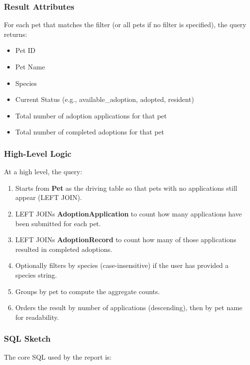 \documentclass[11pt]{article}
\begin{document}
\subsubsection{Result Attributes}

For each pet that matches the filter (or all pets if no filter is specified),
the query returns:

\begin{itemize}
    \item Pet ID
    \item Pet Name
    \item Species
    \item Current Status (e.g., available\_adoption, adopted, resident)
    \item Total number of adoption applications for that pet
    \item Total number of completed adoptions for that pet
\end{itemize}

\subsubsection{High-Level Logic}

At a high level, the query:

\begin{enumerate}
    \item Starts from \textbf{Pet} as the driving table so that pets with no
          applications still appear (LEFT JOIN).
    \item LEFT JOINs \textbf{AdoptionApplication} to count how many applications
          have been submitted for each pet.
    \item LEFT JOINs \textbf{AdoptionRecord} to count how many of those
          applications resulted in completed adoptions.
    \item Optionally filters by species (case-insensitive) if the user has
          provided a species string.
    \item Groups by pet to compute the aggregate counts.
    \item Orders the result by number of applications (descending), then by pet
          name for readability.
\end{enumerate}

\subsubsection{SQL Sketch}

The core SQL used by the report is:
\end{document}
